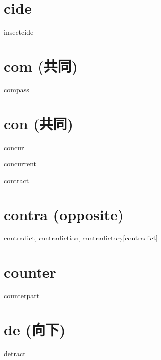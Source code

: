 \section{cide}

\begin{wordRef}{insectcide}
\end{wordRef}

\section{com (共同)}

\begin{wordRef}{compass}
\end{wordRef}

\section{con (共同)}
\begin{wordRef}{concur}
\end{wordRef}

\begin{wordRef}{concurrent}
\end{wordRef}

\begin{wordRef}{contract}
\end{wordRef}

\section{contra (opposite)}

\begin{wordRef}{contradict, contradiction, contradictory}[contradict]
\end{wordRef}

\section{counter}

\begin{wordRef}{counterpart}
\end{wordRef}

\section{de (向下)}

\begin{wordRef}{detract}
\end{wordRef}


